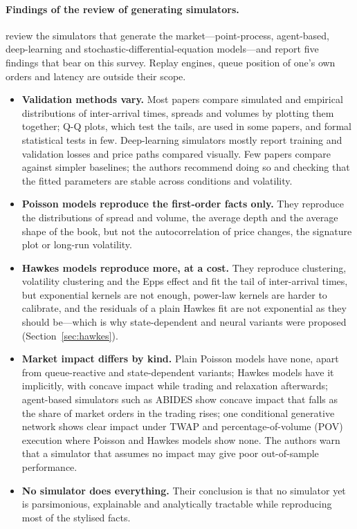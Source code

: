 \paragraph{Findings of the review of generating simulators.} \citet{jain2024sim} review the simulators that generate
the market---point-process, agent-based, deep-learning and stochastic-differential-equation models---and report five
findings that bear on this survey. Replay engines, queue position of one's own orders and latency are outside their
scope.
\begin{itemize}[leftmargin=1.5em,itemsep=2pt]
\item \textbf{Validation methods vary.} Most papers compare simulated and empirical distributions of
  inter-arrival times, spreads and volumes by plotting them together; Q-Q plots, which test the tails, are used in
  some papers, and formal statistical tests in few. Deep-learning simulators mostly report training and validation
  losses and price paths compared visually. Few papers compare against simpler baselines; the authors recommend doing so
  and checking that the fitted parameters are stable across conditions and volatility.
\item \textbf{Poisson models reproduce the first-order facts only.} They reproduce the distributions of spread and
  volume, the average depth and the average shape of the book, but not the autocorrelation of price changes, the
  signature plot or long-run volatility.
\item \textbf{Hawkes models reproduce more, at a cost.} They reproduce clustering, volatility clustering and the Epps
  effect and fit the tail of inter-arrival times, but exponential kernels are not enough, power-law kernels are harder
  to calibrate, and the residuals of a plain Hawkes fit are not exponential as they should be---which is why
  state-dependent and neural variants were proposed (Section~\ref{sec:hawkes}).
\item \textbf{Market impact differs by kind.} Plain Poisson models have none, apart from queue-reactive and
  state-dependent variants; Hawkes models have it implicitly, with concave impact while trading and relaxation
  afterwards; agent-based simulators such as ABIDES show concave impact that falls as the share of market orders in
  the trading rises; one conditional generative network shows clear impact under TWAP and percentage-of-volume (POV) execution where Poisson
  and Hawkes models show none. The authors warn that a simulator that assumes no impact may give poor out-of-sample
  performance.
\item \textbf{No simulator does everything.} Their conclusion is that no simulator yet is parsimonious, explainable
  and analytically tractable while reproducing most of the stylised facts.
\end{itemize}
